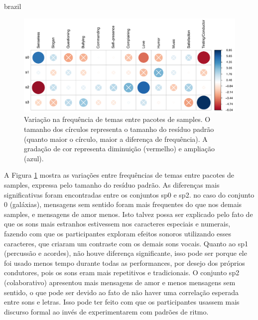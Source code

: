 \begin{otherlanguage*}{brazil}

\begin{figure}
\centering
\includegraphics[width=1\linewidth]{pictures/cap3/p_values}
\caption{Variação na frequência de temas entre pacotes de samples. O tamanho dos círculos representa o tamanho do resíduo padrão (quanto maior o círculo, maior a diferença de frequência). A gradação de cor representa diminuição (vermelho) e ampliação (azul).}
\label{fig:bblplot2}
\end{figure}

A Figura \ref{fig:bblplot2} mostra as variações entre frequências de temas entre pacotes de samples, expressa pelo tamanho do resíduo padrão. As diferenças mais significativas foram encontradas entre os conjuntos sp0 e sp2. no caso do conjunto 0 (galáxias), mensagens sem sentido foram mais frequentes do que nos demais samples, e mensagens de amor menos. Isto talvez possa ser explicado pelo fato de que os sons mais estranhos estivessem nos caracteres especiais e numerais, fazendo com que os participantes exploram efeitos sonoros utilizando esses caracteres, que criaram um contraste com os demais sons vocais. Quanto ao sp1 (percussão e acordes), não houve diferença significante, isso pode ser porque ele foi usado menos tempo durante todas as performances, por desejo dos próprios condutores, pois os sons eram mais repetitivos e tradicionais. O conjunto sp2 (colaborativo) apresentou mais mensagens de amor e menos mensagens sem sentido, o que pode ser devido ao fato de não haver uma correlação esperada entre sons e letras. Isso pode ter feito com que os participantes usassem mais discurso formal ao invés de experimentarem com padrões de ritmo. 


\end{otherlanguage*}
